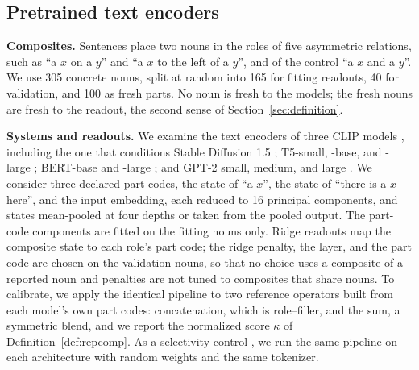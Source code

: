 \documentclass[10pt]{article}
\theoremstyle{plain}
\theoremstyle{remark}
\begin{document}
\subsection{Pretrained text encoders}
\label{sec:pretrained}

\textbf{Composites.} Sentences place two nouns in the roles of five asymmetric relations, such as ``a $x$ on a $y$'' and ``a $x$ to the left of a $y$'', and of the control ``a $x$ and a $y$''. We use 305 concrete nouns, split at random into 165 for fitting readouts, 40 for validation, and 100 as fresh parts. No noun is fresh to the models; the fresh nouns are fresh to the readout, the second sense of Section~\ref{sec:definition}.

\textbf{Systems and readouts.} We examine the text encoders of three CLIP models \citep{radford2021clip}, including the one that conditions Stable Diffusion 1.5 \citep{rombach2022}; T5-small, -base, and -large \citep{raffel2020t5}; BERT-base and -large \citep{devlin2019bert}; and GPT-2 small, medium, and large \citep{radford2019gpt2}. We consider three declared part codes, the state of ``a $x$'', the state of ``there is a $x$ here'', and the input embedding, each reduced to 16 principal components, and states mean-pooled at four depths or taken from the pooled output. The part-code components are fitted on the fitting nouns only. Ridge readouts map the composite state to each role's part code; the ridge penalty, the layer, and the part code are chosen on the validation nouns, so that no choice uses a composite of a reported noun and penalties are not tuned to composites that share nouns. To calibrate, we apply the identical pipeline to two reference operators built from each model's own part codes: concatenation, which is role--filler, and the sum, a symmetric blend, and we report the normalized score $\kappa$ of Definition~\ref{def:repcomp}. As a selectivity control \citep{hewitt2019}, we run the same pipeline on each architecture with random weights and the same tokenizer.
\end{document}
